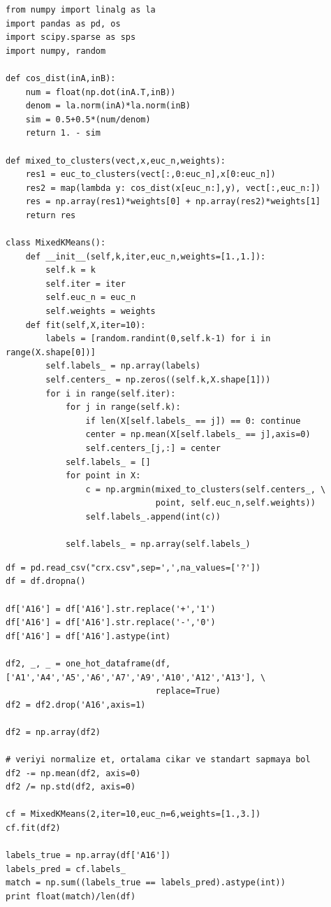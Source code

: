 \documentclass[12pt,fleqn]{article}\usepackage{../common}
\begin{document}
\begin{verbatim}
from numpy import linalg as la
import pandas as pd, os
import scipy.sparse as sps
import numpy, random

def cos_dist(inA,inB):
    num = float(np.dot(inA.T,inB))
    denom = la.norm(inA)*la.norm(inB)
    sim = 0.5+0.5*(num/denom)
    return 1. - sim

def mixed_to_clusters(vect,x,euc_n,weights):
    res1 = euc_to_clusters(vect[:,0:euc_n],x[0:euc_n])
    res2 = map(lambda y: cos_dist(x[euc_n:],y), vect[:,euc_n:])
    res = np.array(res1)*weights[0] + np.array(res2)*weights[1]
    return res

class MixedKMeans():
    def __init__(self,k,iter,euc_n,weights=[1.,1.]):
        self.k = k
        self.iter = iter
        self.euc_n = euc_n
        self.weights = weights
    def fit(self,X,iter=10):
        labels = [random.randint(0,self.k-1) for i in range(X.shape[0])]
        self.labels_ = np.array(labels)
        self.centers_ = np.zeros((self.k,X.shape[1]))
        for i in range(self.iter):
            for j in range(self.k):
                if len(X[self.labels_ == j]) == 0: continue
                center = np.mean(X[self.labels_ == j],axis=0)
                self.centers_[j,:] = center
            self.labels_ = []
            for point in X:
                c = np.argmin(mixed_to_clusters(self.centers_, \
                              point, self.euc_n,self.weights))
                self.labels_.append(int(c))

            self.labels_ = np.array(self.labels_)
\end{verbatim}

\begin{verbatim}
df = pd.read_csv("crx.csv",sep=',',na_values=['?'])
df = df.dropna()

df['A16'] = df['A16'].str.replace('+','1')
df['A16'] = df['A16'].str.replace('-','0')
df['A16'] = df['A16'].astype(int)

df2, _, _ = one_hot_dataframe(df,['A1','A4','A5','A6','A7','A9','A10','A12','A13'], \
                              replace=True)
df2 = df2.drop('A16',axis=1)

df2 = np.array(df2)

# veriyi normalize et, ortalama cikar ve standart sapmaya bol
df2 -= np.mean(df2, axis=0)
df2 /= np.std(df2, axis=0)

cf = MixedKMeans(2,iter=10,euc_n=6,weights=[1.,3.])
cf.fit(df2)

labels_true = np.array(df['A16'])
labels_pred = cf.labels_
match = np.sum((labels_true == labels_pred).astype(int))
print float(match)/len(df)
\end{verbatim}
\end{document}
